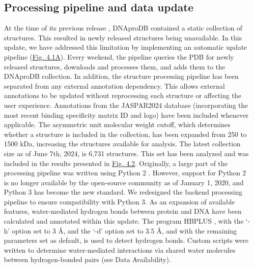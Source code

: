 \subsection{Processing pipeline and data update}
At the time of its previous release \citep{Sagendorf2020}, DNAproDB contained a static collection of structures. This resulted in newly released structures being unavailable. In this update, we have addressed this limitation by implementing an automatic update pipeline (\hyperref[fig:dnaprodb1]{Fig. 4.1A}). Every weekend, the pipeline queries the PDB for newly released structures, downloads and processes them, and adds them to the DNAproDB collection. 
In addition, the structure processing pipeline has been separated from any external annotation dependency. This allows external annotations to be updated without reprocessing each structure or affecting the user experience. Annotations from the JASPAR2024 \citep{Rauluseviciute2024} database (incorporating the most recent binding specificity matrix ID and logo) have been included whenever applicable. 
The asymmetric unit molecular weight cutoff, which determines whether a structure is included in the collection, has been expanded from 250 to 1500 kDa, increasing the structures available for analysis. The latest collection size as of June 7th, 2024, is 6,731 structures. This set has been analyzed and was included in the results presented in \hyperref[fig:dnaprodb2]{Fig. 4.2}. 
Originally, a large part of the processing pipeline was written using Python 2 \citep{Guido1995}. However, support for Python 2 is no longer available by the open-source community as of January 1, 2020, and Python 3 \citep{Guido2009} has become the new standard. We redesigned the backend processing pipeline to ensure compatibility with Python 3. 
As an expansion of available features, water-mediated hydrogen bonds between protein and DNA have been calculated and annotated within this update. The program HBPLUS \citep{McDonald1994}, with the ‘-h’ option set to 3 Å, and the ‘-d’ option set to 3.5 Å, and with the remaining parameters set as default, is used to detect hydrogen bonds. Custom scripts were written to determine water-mediated interactions via shared water molecules between hydrogen-bonded pairs (see Data Availability).  

